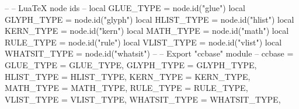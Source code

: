 \egroup
%
%
\luacode
--
-- LuaTeX node ids
--
local GLUE_TYPE    = node.id("glue")
local GLYPH_TYPE   = node.id("glyph")
local HLIST_TYPE   = node.id("hlist")
local KERN_TYPE    = node.id("kern")
local MATH_TYPE    = node.id("math")
local RULE_TYPE    = node.id("rule")
local VLIST_TYPE   = node.id("vlist")
local WHATSIT_TYPE = node.id("whatsit")
--
-- Export "ccbase" module
--
ccbase = {
  GLUE_TYPE    = GLUE_TYPE,
  GLYPH_TYPE   = GLYPH_TYPE,
  HLIST_TYPE   = HLIST_TYPE,
  KERN_TYPE    = KERN_TYPE,
  MATH_TYPE    = MATH_TYPE,
  RULE_TYPE    = RULE_TYPE,
  VLIST_TYPE   = VLIST_TYPE,
  WHATSIT_TYPE = WHATSIT_TYPE,
}
\endluacode
\endinput
